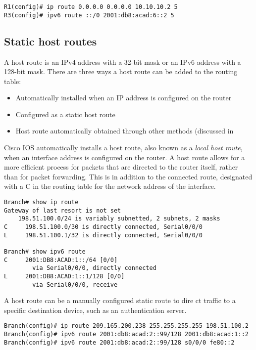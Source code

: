 \begin{verbatim}
R1(config)# ip route 0.0.0.0 0.0.0.0 10.10.10.2 5
R3(config)# ipv6 route ::/0 2001:db8:acad:6::2 5
\end{verbatim}

\subsection{Static host routes}

A host route is an IPv4 address with a 32-bit mask or an IPv6 address with a 128-bit mask. There are three ways a host route can be added to the routing table:

\begin{itemize}
\item Automatically installed when an IP address is configured on the router
\item Configured as a static host route
\item Host route automatically obtained through other methods (discussed in
\end{itemize}

Cisco IOS automatically installs a host route, also known as a \emph{local host route}, when an interface address is configured on the router. A host route allows for a more efficient process for packets that are directed to the router itself, rather than for packet forwarding. This is in addition to the connected route, designated with a C in the routing table for the network address of the interface.

\begin{verbatim}
Branch# show ip route
Gateway of last resort is not set
    198.51.100.0/24 is variably subnetted, 2 subnets, 2 masks
C     198.51.100.0/30 is directly connected, Serial0/0/0
L     198.51.100.1/32 is directly connected, Serial0/0/0

Branch# show ipv6 route
C     2001:DB8:ACAD:1::/64 [0/0]
        via Serial0/0/0, directly connected
L     2001:DB8:ACAD:1::1/128 [0/0]
        via Serial0/0/0, receive
\end{verbatim}

A host route can be a manually configured static route to dire ct traffic to a specific destination device, such as an authentication server.

\begin{verbatim}
Branch(config)# ip route 209.165.200.238 255.255.255.255 198.51.100.2
Branch(config)# ipv6 route 2001:db8:acad:2::99/128 2001:db8:acad:1::2
Branch(config)# ipv6 route 2001:db8:acad:2::99/128 s0/0/0 fe80::2
\end{verbatim}